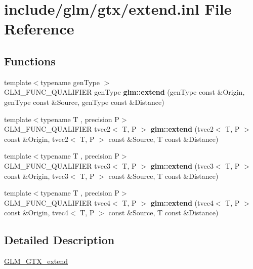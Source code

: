 \hypertarget{extend_8inl}{}\section{include/glm/gtx/extend.inl File Reference}
\label{extend_8inl}
\subsection*{Functions}
\begin{DoxyCompactItemize}
\item 
\mbox{\label{extend_8inl_a88c4890406fab3280de470ce780e6b9d}} 
{\footnotesize template$<$typename gen\+Type $>$ }\\G\+L\+M\+\_\+\+F\+U\+N\+C\+\_\+\+Q\+U\+A\+L\+I\+F\+I\+ER gen\+Type {\bfseries glm\+::extend} (gen\+Type const \&Origin, gen\+Type const \&Source, gen\+Type const \&Distance)
\item 
\mbox{\label{extend_8inl_a432a531afe9ca9e820a0fb31d5d0f5eb}} 
{\footnotesize template$<$typename T , precision P$>$ }\\G\+L\+M\+\_\+\+F\+U\+N\+C\+\_\+\+Q\+U\+A\+L\+I\+F\+I\+ER tvec2$<$ T, P $>$ {\bfseries glm\+::extend} (tvec2$<$ T, P $>$ const \&Origin, tvec2$<$ T, P $>$ const \&Source, T const \&Distance)
\item 
\mbox{\label{extend_8inl_a5771da74ce8281d316accbbd4d704e95}} 
{\footnotesize template$<$typename T , precision P$>$ }\\G\+L\+M\+\_\+\+F\+U\+N\+C\+\_\+\+Q\+U\+A\+L\+I\+F\+I\+ER tvec3$<$ T, P $>$ {\bfseries glm\+::extend} (tvec3$<$ T, P $>$ const \&Origin, tvec3$<$ T, P $>$ const \&Source, T const \&Distance)
\item 
\mbox{\label{extend_8inl_a867ffccf950071fefa345b66fb1578f0}} 
{\footnotesize template$<$typename T , precision P$>$ }\\G\+L\+M\+\_\+\+F\+U\+N\+C\+\_\+\+Q\+U\+A\+L\+I\+F\+I\+ER tvec4$<$ T, P $>$ {\bfseries glm\+::extend} (tvec4$<$ T, P $>$ const \&Origin, tvec4$<$ T, P $>$ const \&Source, T const \&Distance)
\end{DoxyCompactItemize}


\subsection{Detailed Description}
\hyperlink{group__gtx__extend}{G\+L\+M\+\_\+\+G\+T\+X\+\_\+extend} 